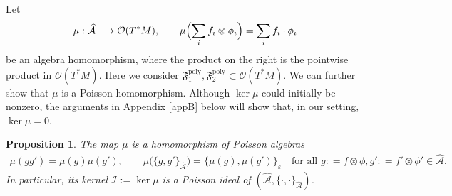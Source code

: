 \documentclass[11pt]{amsart}
\newtheorem{proposition}[theorem]{Proposition}
\theoremstyle{definition}
\theoremstyle{plain}
\theoremstyle{conclusion}
\begin{document}

Let \begin{align} \mu:\widehat{\mathcal{A}}\longrightarrow \mathcal{O}(T^*M),\qquad \mu\Bigl(\sum_i f_i\otimes\phi_i\Bigr)=\sum_i f_i\cdot\phi_i   \label{eq:defmu} \end{align} be an algebra homomorphism, where the product on the right is the pointwise product in $\mathcal{O}(T^*M)$. Here we consider $\mathfrak{F}_1^{\mathrm{poly}},\mathfrak{F}_2^{\mathrm{poly}}\subset \mathcal{O}(T^*M)$. We can further show that $\mu$ is a Poisson homomorphism. Although $\ker\mu$ could initially be nonzero, the arguments in Appendix \ref{appB} below will show that, in our setting, $\ker\mu=0$. 

\begin{proposition}
    The map $\mu$ is a homomorphism of Poisson algebras \begin{align*}
   \mu(g g')=\mu(g)\mu(g'),\qquad \mu\bigl(\{g,g'\}_{\widehat{\mathcal{A}}}\bigr)=\{\mu(g),\mu(g')\}_\varepsilon \quad\text{for all }g : = f \otimes \phi,g': = f' \otimes \phi' \in\widehat{\mathcal{A}}. 
\end{align*} In particular, its kernel $\mathcal{I} := \ker \mu$ is a Poisson ideal of $\left(\widehat{\mathcal{A}},\{\cdot ,\cdot \}_{\widehat{\mathcal{A}}}\right)$.
\end{proposition}
 
\end{document}
